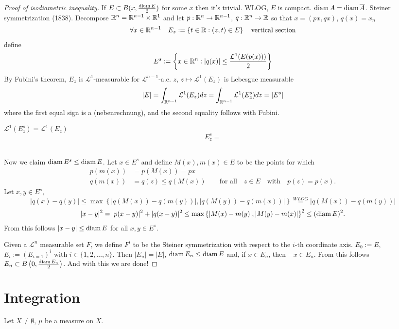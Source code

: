 \begin{proof}[Proof of isodiametric inequality]
If $E \subset B(x, \frac{\operatorname{diam} E}{2})$ for some $x$ then it's trivial.
WLOG, $E$ is compact. $\operatorname{diam} A = \operatorname{diam} \overline{A}$.
Steiner symmetrization (1838). Decompose $\mathbb{R}^n = \mathbb{R}^{n-1}\times \mathbb{R}^1$ and let $p
: \mathbb{R}^n \to \mathbb{R}^{n-1}$, $q: \mathbb{R}^n \to \mathbb{R}$ so that $x = (px, qx)$, $q(x) = x_n$
\[
\forall x \in \mathbb{R}^{n-1} \quad E_z := \left\{t\in\mathbb{R} : (z,t) \in E\right\}
\quad \textnormal{vertical section}
\]
define
\[
E^s := \left\{ x \in \mathbb{R}^n: |q(x)| \leq \frac{\mathcal{L}^1(E(p(x)))}{2}\right\}
\]
By Fubini's theorem, $E_z$ is $\mathcal{L}^1$-measurable for
$\mathcal{L}^{n-1}$-a.e. $z$, $z \mapsto \mathcal{L}^1(E_z)$ is Lebesgue
measurable 
\[
|E| = \int_{\mathbb{R}^{n-1}} \mathcal{L}^1(E_z) dz = \int_{\mathbb{R}^{n-1}}
\mathcal{L}^1(E_z^s) dz = |E^s|
\]
where the first equal sign is a \TODO(nebenrechnung), and the second equality
follows with Fubini.
\parbox{1\linewidth}{
$\mathcal{L}^1(E^s_z) = \mathcal{L}^1(E_z)$	
\[
E^s_z = 
\]
}
\\ %
Now we claim $\operatorname{diam} E^s \leq \operatorname{diam} E$. Let $x \in E^s$ and define $M(x), m(x)
\in E$ to be the points for which 
\[
\begin{aligned}
p(m(x)) &= p(M (x)) = px
\\
q(m(x)) &= q(z) \leq q(M(x))
\qquad \text{for all} \quad z \in E \quad \text{with} \quad p(z) = p(x).
\end{aligned}
\]
Let $x,y \in E^s$, 
\[
|q(x) - q(y)| \leq \max \left\{|q(M(x)) - q(m(y))|, |q(M(y)) - q(m(x))|\right\}
\overset{WLOG}{=} |q(M(x)) - q(m(y))|
\]
\[
|x-y|^2 = |p(x-y)|^2 + |q(x-y)|^2 \leq \max \left\{|M(x) - m(y)|, |M(y) -
m(x)|\right\}^2
\leq (\operatorname{diam} E)^2 .
\]
From this follows $|x - y| \leq \operatorname{diam} E$ for all $x,y \in E^s$.

Given a $\mathcal{L}^n$ measurable set $F$, we define $F^i$ to be the Steiner
symmetrization with respect to the $i$-th coordinate axis.
$E_0 := E$, $E_i := (E_{i=1})^i$ with $i \in \{1,2,\dots,n\}$. Then $|E_n| = |E|$,
$\operatorname{diam} E_n \leq \operatorname{diam} E$ and, if $x\in E_n$, then $-x \in E_n$. From this
follows $E_n \subset B\left(0,\frac{\operatorname{diam} E_n}{2}\right)$.
And with this we are done!
\end{proof}

\section{Integration}

Let $X \neq \emptyset$, $\mu$ be a measure on $X$.

